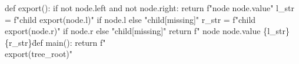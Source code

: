 \begin{TcblistingMintedPython}
def export():
    if not node.left and not node.right:
        return f"node {node.value}" 
    l_str = f"child {export(node.l)}" if node.l else "child[missing]"
    r_str = f"child {export(node.r)}" if node.r else "child[missing]"
    return f" node {node.value} \{{l_str}\} \{{r_str}\}\"

def main():
    return f"\\{export(tree_root)}"
\end{TcblistingMintedPython}